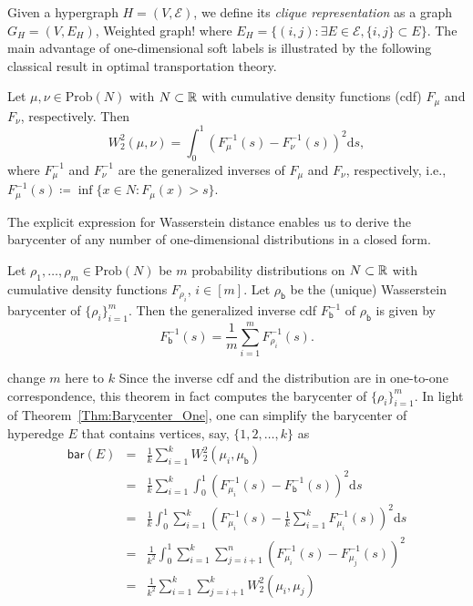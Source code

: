 \documentclass[letterpaper]{article} %
\begin{document}
Given a hypergraph $H=(V, \mathcal E)$, we define its \textit{clique representation} as a graph $G_H=(V, E_H)$, {\color{blue}Weighted graph!} where $E_H=\{(i, j):\exists E\in \mathcal E, \{i, j\}\subset E\}$. The main advantage of one-dimensional soft labels is illustrated by the following classical result in optimal transportation theory.
\begin{theorem}\label{Thm:Wasserstein_One}
Let $\mu, \nu\in \mathrm{Prob}(N)$ with $N\subset\mathbb{R}$ with cumulative density functions (cdf) $F_\mu$ and $F_\nu$, respectively. Then $$W_2^2(\mu, \nu)=\int_{0}^1\left(F_\mu^{-1}(s)-F_\nu^{-1}(s)\right)^2\text{d}s,$$
where $F_{\mu}^{-1}$ and $F_{\nu}^{-1}$ are the generalized inverses of $F_\mu$ and $F_\nu$, respectively, i.e., $F_\mu^{-1}(s)\coloneqq \inf\{x\in N:F_\mu(x)>s\}$. 
\end{theorem}
The explicit expression for Wasserstein distance enables us to derive the barycenter of any number of one-dimensional distributions in a closed form. 
\begin{theorem}
\label{Thm:Barycenter_One}
Let $\rho_1, \dots, \rho_m\in \mathrm{Prob}(N)$ be $m$ probability distributions on $N\subset\mathbb{R}$ with cumulative density functions $F_{\rho_i}$, $i\in [m]$. Let $\rho_{\mathsf{b}}$ be the (unique) Wasserstein barycenter of $\{\rho_i\}_{i=1}^m$. Then the generalized inverse cdf $F^{-1}_{\mathsf{b}}$ of $\rho_{\mathsf{b}}$ is given by 
$$F^{-1}_{\mathsf{b}}(s)=\frac{1}{m}\sum_{i=1}^mF_{\rho_i}^{-1}(s).$$
\end{theorem}
{\color{blue} change $m$ here to $k$}
Since the inverse cdf and the distribution are in one-to-one correspondence, this theorem in fact computes the barycenter of $\{\rho_i\}_{i=1}^m$. In light of Theorem~\ref{Thm:Barycenter_One}, one can simplify the barycenter of hyperedge $E$ that contains vertices, say, $\{1, 2, \dots, k\}$ as 
\begin{eqnarray}
\mathsf{bar}(E) &=& \frac{1}{k}\sum_{i=1}^kW^2_2(\mu_i, \mu_\mathsf{b})\nonumber\\
&=&\frac{1}{k}\sum_{i=1}^k\int_{0}^1\left(F_{\mu_i}^{-1}(s)-F_\mathsf{b}^{-1}(s)\right)^2\text{d}s\nonumber\\
&=&\frac{1}{k}\int_{0}^{1}\sum_{i=1}^k\left(F_{\mu_i}^{-1}(s)-\frac{1}{k}\sum_{i=1}^kF_{\mu_i}^{-1}(s)\right)^2\text{d}s\nonumber\\
&=&\frac{1}{k^2}\int_0^1\sum_{i=1}^k\sum_{j=i+1}^n\left(F_{\mu_i}^{-1}(s)-F_{\mu_j}^{-1}(s)\right)^2 \nonumber\\
&=&\frac{1}{k^2}\sum_{i=1}^k\sum_{j=i+1}^kW_2^2(\mu_i, \mu_j)\label{Eq:One_D_Equivalence}
\end{eqnarray}
\end{document}
